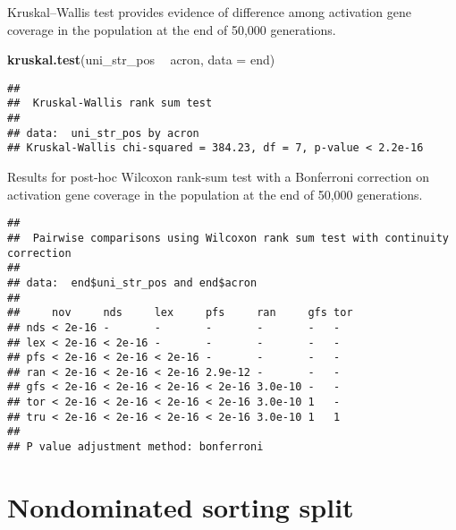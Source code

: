 \documentclass[]{book}
\newenvironment{Shaded}{\begin{snugshade}}{\end{snugshade}}
\newcommand{\DataTypeTok}[1]{\textcolor[rgb]{0.13,0.29,0.53}{#1}}
\newcommand{\KeywordTok}[1]{\textcolor[rgb]{0.13,0.29,0.53}{\textbf{#1}}}
\newcommand{\NormalTok}[1]{#1}
\newcommand{\OperatorTok}[1]{\textcolor[rgb]{0.81,0.36,0.00}{\textbf{#1}}}
\newcommand{\OtherTok}[1]{\textcolor[rgb]{0.56,0.35,0.01}{#1}}
\newcommand{\StringTok}[1]{\textcolor[rgb]{0.31,0.60,0.02}{#1}}
\begin{document}
Kruskal--Wallis test provides evidence of difference among activation gene coverage in the population at the end of 50,000 generations.

\begin{Shaded}
\begin{Highlighting}[]
\KeywordTok{kruskal.test}\NormalTok{(uni_str_pos }\OperatorTok{~}\StringTok{ }\NormalTok{acron, }\DataTypeTok{data =}\NormalTok{ end)}
\end{Highlighting}
\end{Shaded}

\begin{verbatim}
## 
##  Kruskal-Wallis rank sum test
## 
## data:  uni_str_pos by acron
## Kruskal-Wallis chi-squared = 384.23, df = 7, p-value < 2.2e-16
\end{verbatim}

Results for post-hoc Wilcoxon rank-sum test with a Bonferroni correction on activation gene coverage in the population at the end of 50,000 generations.

\begin{Shaded}
\end{Shaded}

\begin{verbatim}
## 
##  Pairwise comparisons using Wilcoxon rank sum test with continuity correction 
## 
## data:  end$uni_str_pos and end$acron 
## 
##     nov     nds     lex     pfs     ran     gfs tor
## nds < 2e-16 -       -       -       -       -   -  
## lex < 2e-16 < 2e-16 -       -       -       -   -  
## pfs < 2e-16 < 2e-16 < 2e-16 -       -       -   -  
## ran < 2e-16 < 2e-16 < 2e-16 2.9e-12 -       -   -  
## gfs < 2e-16 < 2e-16 < 2e-16 < 2e-16 3.0e-10 -   -  
## tor < 2e-16 < 2e-16 < 2e-16 < 2e-16 3.0e-10 1   -  
## tru < 2e-16 < 2e-16 < 2e-16 < 2e-16 3.0e-10 1   1  
## 
## P value adjustment method: bonferroni
\end{verbatim}

\hypertarget{nondominated-sorting-split}{%
\section{Nondominated sorting split}\label{nondominated-sorting-split}}
\end{document}
